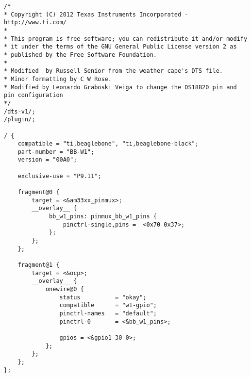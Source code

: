 \lstset{language=bash}
\begin{lstlisting}[frame=single, basicstyle=\linespread{0.85}\ttfamily, caption=w1.dts, label=dt_ds18b20]
/*
* Copyright (C) 2012 Texas Instruments Incorporated - http://www.ti.com/
*
* This program is free software; you can redistribute it and/or modify
* it under the terms of the GNU General Public License version 2 as
* published by the Free Software Foundation.
* 
* Modified  by Russell Senior from the weather cape's DTS file.
* Minor formatting by C W Rose.
* Modified by Leonardo Graboski Veiga to change the DS18B20 pin and pin configuration
*/
/dts-v1/;
/plugin/;

/ {
    compatible = "ti,beaglebone", "ti,beaglebone-black";
    part-number = "BB-W1";
    version = "00A0";

    exclusive-use = "P9.11";

    fragment@0 {
        target = <&am33xx_pinmux>;
        __overlay__ {
             bb_w1_pins: pinmux_bb_w1_pins {
                 pinctrl-single,pins =  <0x70 0x37>;
             };
        };
    };

    fragment@1 {
        target = <&ocp>;
        __overlay__ {
            onewire@0 {
                status          = "okay";
                compatible      = "w1-gpio";
                pinctrl-names   = "default";
                pinctrl-0       = <&bb_w1_pins>;

                gpios = <&gpio1 30 0>;
            };
        };
    };
};
\end{lstlisting}
